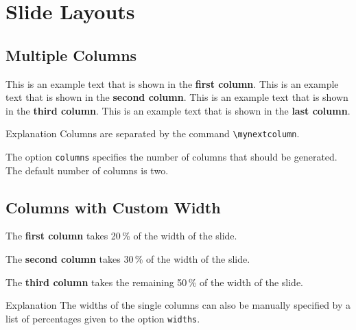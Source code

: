 \documentclass[
	aspectratio=169, %
	8pt, %
]{beamer}
\begin{document}
{\section{Slide Layouts}

\subsection{Multiple Columns}
\begin{frame}{\insertsubsection}
	\begin{mycolumns}[columns=4] %
		This is an example text that is shown in the \textbf{first column}.
	\mynextcolumn
		This is an example text that is shown in the \textbf{second column}.
	\mynextcolumn
		This is an example text that is shown in the \textbf{third column}.
	\mynextcolumn
		This is an example text that is shown in the \textbf{last column}.
	\end{mycolumns}
	\vfill
	\begin{note}{Explanation}
		Columns are separated by the command \texttt{\textbackslash mynextcolumn}.

		The option \texttt{columns} specifies the number of columns that should be generated. The default number of columns is two.
	\end{note}
\end{frame}

\subsection{Columns with Custom Width}
\begin{frame}{\insertsubsection}
	\begin{mycolumns}[columns=3,widths={20,30}]
		\begin{example}{}
			The \textbf{first column} takes 20\,\% of the width of the slide.
		\end{example}
	\mynextcolumn
		\begin{example}{}
			The \textbf{second column} takes 30\,\% of the width of the slide.
		\end{example}
	\mynextcolumn
		\begin{example}{}
			The \textbf{third column} takes the remaining 50\,\% of the width of the slide.
		\end{example}
	\end{mycolumns}
	\vfill
	\begin{note}{Explanation}
		The widths of the single columns can also be manually specified by a list of percentages given to the option \texttt{widths}.


\end{note}
\end{frame}}
\end{document}
